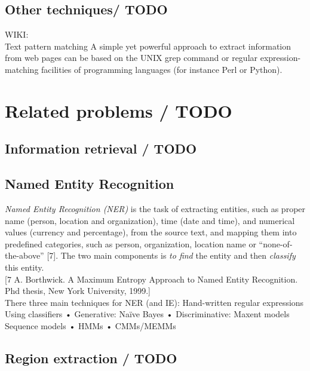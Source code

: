 \subsection{Other techniques/ TODO}

WIKI:\\
Text pattern matching
A simple yet powerful approach to extract information from web pages can be based on the UNIX grep command or regular expression-matching facilities of programming languages (for instance Perl or Python).



\section{Related problems / TODO}

\subsection{Information retrieval / TODO}

\subsection{Named Entity Recognition}
\textit{Named Entity Recognition (NER)} is the task of extracting entities, such as proper name (person, location and organization), time (date and time), and numerical values (currency and percentage), from the source text, and mapping them into predefined categories, such as person, organization, location name or “none-of-the-above” [7]. The two main components is \textit{to find} the entity and then \textit{classify} this entity. \\

[7 A. Borthwick. A Maximum Entropy Approach to Named Entity Recognition. Phd thesis, New York University, 1999.]\\

There three main techniques for NER (and IE): 
\te
Hand-written regular expressions\\
Using classifiers
• Generative: Naïve Bayes
• Discriminative: Maxent models\\
Sequence models
• HMMs
• CMMs/MEMMs\\


\subsection{Region extraction / TODO}

